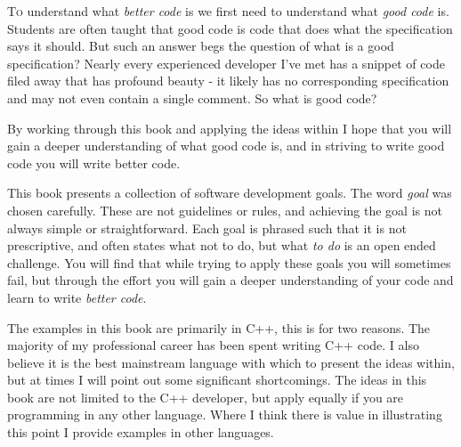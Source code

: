 
\lettrine[lhang=0.17] To understand what \textit{better code} is we first need to understand what \textit{good code} is. Students are often taught that good code is code that does what the specification says it should. But such an answer begs the question of what is a good specification? Nearly every experienced developer I've met has a snippet of code filed away that has profound beauty - it likely has no corresponding specification and may not even contain a single comment. So what is good code?

By working through this book and applying the ideas within I hope that you will gain a deeper understanding of what good code is, and in striving to write good code you will write better code.

This book presents a collection of software development goals. The word \textit{goal} was chosen carefully. These are not guidelines or rules, and achieving the goal is not always simple or straightforward. Each goal is phrased such that it is not prescriptive, and often states what not to do, but what \textit{to do} is an open ended challenge. You will find that while trying to apply these goals you will sometimes fail, but through the effort you will gain a deeper understanding of your code and learn to write \textit{better code}.

The examples in this book are primarily in C++, this is for two reasons. The majority of my professional career has been spent writing C++ code. I also believe it is the best mainstream language with which to present the ideas within, but at times I will point out some significant shortcomings. The ideas in this book are not limited to the C++ developer, but apply equally if you are programming in any other language. Where I think there is value in illustrating this point I provide examples in other languages. 

